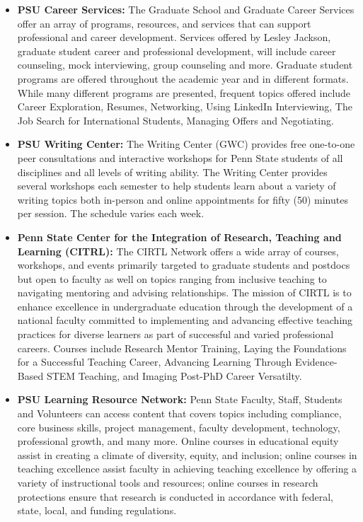 \documentclass[11pt]{article}
\begin{document}
\begin{itemize}
\item \textbf{PSU Career Services:}
The Graduate School and Graduate Career Services offer an array of programs, resources, and services that can support professional and career development. Services offered by Lesley Jackson, graduate student career and professional development, will include career counseling, mock interviewing, group counseling and more. Graduate student programs are offered throughout the academic year and in different formats.  While many different programs are presented, frequent topics offered include Career Exploration, Resumes, Networking, Using LinkedIn Interviewing, The Job Search for International Students, Managing Offers and Negotiating.

\item \textbf{PSU Writing Center:} The Writing Center (GWC) provides free one-to-one peer consultations and interactive workshops for Penn State students of all disciplines and all levels of writing ability. The Writing Center provides several workshops each semester to help students learn about a variety of writing topics both in-person and online appointments for fifty (50) minutes per session.  The schedule varies each week. 

\item \textbf{Penn State Center for the Integration of Research, Teaching and Learning (CITRL):} The CIRTL Network offers a wide array of courses, workshops, and events primarily targeted to graduate students and postdocs but open to faculty as well on topics ranging from inclusive teaching to navigating mentoring and advising relationships. The mission of CIRTL is to enhance excellence in undergraduate education through the development of a national faculty committed to implementing and advancing effective teaching practices for diverse learners as part of successful and varied professional careers. Courses include Research Mentor Training, Laying the Foundations for a Successful Teaching Career, Advancing Learning Through Evidence-Based STEM Teaching, and Imaging Post-PhD Career Versatilty.

\item \textbf{PSU Learning Resource Network:} Penn State Faculty, Staff, Students and Volunteers can access content that covers topics including compliance, core business skills, project management, faculty development, technology, professional growth, and many more. Online courses in educational equity assist in creating a climate of diversity, equity, and inclusion; online courses in teaching excellence assist faculty in achieving teaching excellence by offering a variety of instructional tools and resources; online courses in research protections ensure that research is conducted in accordance with federal, state, local, and funding regulations.


\end{itemize}
\end{document}
